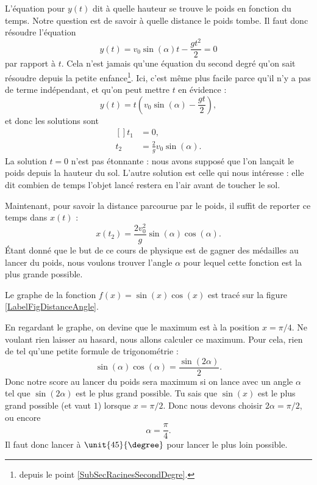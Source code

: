 L'équation pour $y(t)$ dit à quelle hauteur se trouve le poids en fonction du temps. Notre question est de savoir à quelle distance le poids tombe. Il faut donc résoudre l'équation
\begin{equation}
	y(t)=v_0\sin(\alpha) t -\frac{ gt^2 }{ 2 }=0
\end{equation}
par rapport à $t$. Cela n'est jamais qu'une équation du second degré qu'on sait résoudre depuis la petite enfance\footnote{depuis le point \ref{SubSecRacinesSecondDegre}.}. Ici, c'est même plus facile parce qu'il n'y a pas de terme indépendant, et qu'on peut mettre $t$ en évidence :
\begin{equation}
	y(t)=t\left( v_0\sin(\alpha)-\frac{ gt }{ 2 } \right),
\end{equation}
et donc les solutions sont
\begin{equation}
	\begin{aligned}[]
		t_1&=0,\\
		t_2&=\frac{ 2 }{ g }v_0\sin(\alpha).
	\end{aligned}
\end{equation}
La solution $t=0$ n'est pas étonnante : nous avons supposé que l'on lançait le poids depuis la hauteur du sol. L'autre solution est celle qui nous intéresse : elle dit combien de temps l'objet lancé restera en l'air avant de toucher le sol.

Maintenant, pour savoir la distance parcourue par le poids, il suffit de reporter ce temps dans $x(t)$ :
\begin{equation}			\label{EqDistancePoinds}
	x(t_2)=\frac{ 2v_0^2 }{ g }\sin(\alpha)\cos(\alpha).
\end{equation}
Étant donné que le but de ce cours de physique est de gagner des médailles au lancer du poids, nous voulons trouver l'angle $\alpha$ pour lequel cette fonction est la plus grande possible.

Le graphe de la fonction $f(x)=\sin(x)\cos(x)$ est tracé sur la figure \ref{LabelFigDistanceAngle}.
\newcommand{\CaptionFigDistanceAngle}{En bleu, la fonction qui nous intéresse : $\sin(x)\cos(x)$. Pour information, en rouge se trouve la fonction $\sin(x)$}


En regardant le graphe, on devine que le maximum est à la position $x=\pi/4$. Ne voulant rien laisser au hasard, nous allons calculer ce maximum. Pour cela, rien de tel qu'une petite formule de trigonométrie :
\begin{equation}
	\sin(\alpha)\cos(\alpha)=\frac{ \sin(2\alpha) }{2}.
\end{equation}
Donc notre score au lancer du poids sera maximum si on lance avec un angle $\alpha$ tel que $\sin(2\alpha)$ est le plus grand possible. Tu sais que $\sin(x)$ est le plus grand possible (et vaut $1$) lorsque $x=\pi/2$. Donc nous devons choisir $2\alpha=\pi/2$, ou encore
\begin{equation}
	\alpha=\frac{ \pi }{ 4 }.
\end{equation}
Il faut donc lancer à $\unit{45}{\degree}$ pour lancer le plus loin possible.

